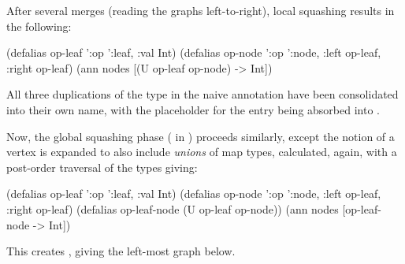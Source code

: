 After several merges (reading the graphs left-to-right), local squashing results in the following:

\begin{cljlisting}
(defalias op-leaf '{:op ':leaf, :val Int})
(defalias op-node '{:op ':node, :left op-leaf, :right op-leaf})
(ann nodes [(U op-leaf op-node) -> Int])
\end{cljlisting}

All three duplications of the  type in the naive annotation have
been consolidated into their own name,
with the  placeholder for the  entry being absorbed into .

Now, the global squashing phase (\squashglobal{} in )
proceeds similarly, except the notion of a vertex is expanded to also include
\emph{unions} of map types, calculated, again, with a post-order traversal of the types
giving:

\begin{cljlisting}
(defalias op-leaf '{:op ':leaf, :val Int})
(defalias op-node '{:op ':node, :left op-leaf, :right op-leaf})
(defalias op-leaf-node (U op-leaf op-node))
(ann nodes [op-leaf-node -> Int])
\end{cljlisting}

This creates , giving the left-most graph below.

